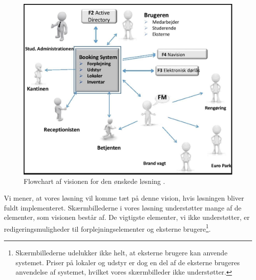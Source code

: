 \begin{figure}[h!]
  \centering
    \includegraphics[width=\textwidth]{Appendix/GUI-Prototype/DesiredFlow}
  \caption{Flowchart af visionen for den ønskede løsning \cite[s. 4]{kravspec}.}
\label{Fig:Evaluation_KS_situation_goal}
\end{figure}

Vi mener, at vores løsning vil komme tæt på denne vision, hvis løsningen bliver fuldt implementeret. Skærmbillederne i vores løsning understøtter mange af de elementer, som visionen består af. De vigtigste elementer, vi ikke understøtter, er redigeringsmuligheder til forplejningselementer og eksterne brugere\footnote{Skærmbillederne udelukker ikke helt, at eksterne brugere kan anvende systemet. Priser på lokaler og udstyr er dog en del af de eksterne brugeres anvendelse af systemet, hvilket vores skærmbilleder ikke understøtter.}.

